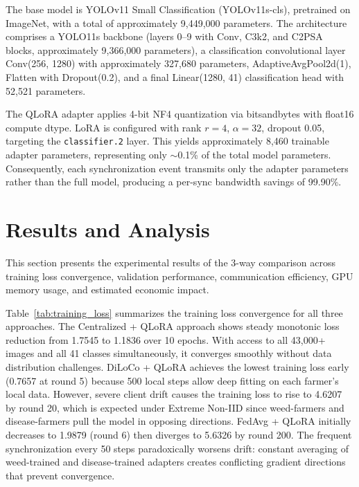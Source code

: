 \documentclass[conference, compsoc, twoside]{IEEEtran}
\begin{document}
The base model is YOLOv11 Small Classification (YOLOv11s-cls), pretrained on ImageNet, with a total of approximately 9,449,000 parameters. The architecture comprises a YOLO11s backbone (layers 0--9 with Conv, C3k2, and C2PSA blocks, approximately 9,366,000 parameters), a classification convolutional layer Conv(256, 1280) with approximately 327,680 parameters, AdaptiveAvgPool2d(1), Flatten with Dropout(0.2), and a final Linear(1280, 41) classification head with 52,521 parameters.

The QLoRA adapter applies 4-bit NF4 quantization via bitsandbytes with float16 compute dtype. LoRA is configured with rank $r=4$, $\alpha=32$, dropout 0.05, targeting the \texttt{classifier.2} layer. This yields approximately 8,460 trainable adapter parameters, representing only $\sim$0.1\% of the total model parameters. Consequently, each synchronization event transmits only the adapter parameters rather than the full model, producing a per-sync bandwidth savings of 99.90\%.

\section{Results and Analysis}

This section presents the experimental results of the 3-way comparison across training loss convergence, validation performance, communication efficiency, GPU memory usage, and estimated economic impact.

Table~\ref{tab:training_loss} summarizes the training loss convergence for all three approaches. The Centralized + QLoRA approach shows steady monotonic loss reduction from 1.7545 to 1.1836 over 10 epochs. With access to all 43,000+ images and all 41 classes simultaneously, it converges smoothly without data distribution challenges. DiLoCo + QLoRA achieves the lowest training loss early (0.7657 at round 5) because 500 local steps allow deep fitting on each farmer's local data. However, severe client drift causes the training loss to rise to 4.6207 by round 20, which is expected under Extreme Non-IID since weed-farmers and disease-farmers pull the model in opposing directions. FedAvg + QLoRA initially decreases to 1.9879 (round 6) then diverges to 5.6326 by round 200. The frequent synchronization every 50 steps paradoxically worsens drift: constant averaging of weed-trained and disease-trained adapters creates conflicting gradient directions that prevent convergence.
\end{document}
